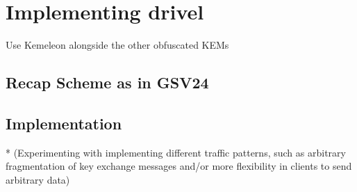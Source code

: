 \chapter{Implementing drivel}\label{ch:tbd}

Use Kemeleon alongside the other obfuscated KEMs

\section{Recap Scheme as in GSV24} \label{sec:tbd}

\section{Implementation} \label{sec:tbd}

* (Experimenting with implementing different traffic patterns, such as arbitrary fragmentation of key
exchange messages and/or more flexibility in clients to send arbitrary data)